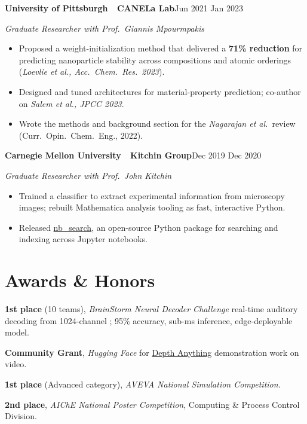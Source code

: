 \documentclass[10pt,letterpaper]{article}
\newcommand{\sansfam}{\sffamily}
\newcommand{\monofam}{\ttfamily}
\newcommand{\bdash}{\,\textemdash\,}
\newcommand{\datestamp}[1]{{\sansfam\footnotesize\color{meta}\figureversion{lf}#1}}
\newcommand{\role}[2]{%
  \filbreak%
  \par\vspace{1pt}%
  \noindent\textbf{#1}\hfill\datestamp{#2}\par\nopagebreak}
\newcommand{\sub}[1]{\noindent\textit{\footnotesize\color{meta} #1}\par\nopagebreak}
\newcommand{\acro}[1]{\textls[80]{#1}}
\begin{document}
\role{University of Pittsburgh \bdash{} CANELa Lab}{Jun 2021 \textendash{} Jan 2023}
\sub{Graduate Researcher with Prof.\ Giannis Mpourmpakis}
\begin{itemize}
  \item Proposed a weight-initialization method that delivered a \textbf{71\% \acro{RMSE} reduction} for predicting nanoparticle stability across compositions and atomic orderings (\emph{Loevlie et al., Acc.\ Chem.\ Res.\ 2023}).
  \item Designed and tuned \acro{ML} architectures for material-property prediction; co-author on \emph{Salem et al., JPCC 2023}.
  \item Wrote the \acro{ML} methods and background section for the \emph{Nagarajan et al.}\ review (Curr.\ Opin.\ Chem.\ Eng., 2022).
\end{itemize}

\role{Carnegie Mellon University \bdash{} Kitchin Group}{Dec 2019 \textendash{} Dec 2020}
\sub{Graduate Researcher with Prof.\ John Kitchin}
\begin{itemize}
  \item Trained a \acro{CNN} classifier to extract experimental information from microscopy images; rebuilt Mathematica analysis tooling as fast, interactive Python.
  \item Released \href{https://tinyurl.com/yzpperdc}{\monofam nb\_search}, an open-source Python package for searching and indexing across Jupyter notebooks.
\end{itemize}

\section{Awards \& Honors}

\begin{list}{}{%
  \setlength{\leftmargin}{3.4em}%
  \setlength{\labelwidth}{2.6em}%
  \setlength{\labelsep}{0.5em}%
  \setlength{\itemsep}{1pt}%
  \setlength{\parsep}{0pt}%
  \setlength{\topsep}{1pt}}
\item[\datestamp{2026}] \textbf{1st place} (10 teams), \textit{BrainStorm Neural Decoder Challenge}\bdash{}real-time auditory decoding from 1024-channel \acro{ECoG}; 95\% accuracy, sub-ms inference, edge-deployable model.
\item[\datestamp{2024}] \textbf{Community Grant}, \textit{Hugging Face}\bdash{}for \href{https://depth-anything.github.io/}{Depth Anything} demonstration work on video.
\item[\datestamp{2019}] \textbf{1st place} (Advanced category), \textit{AVEVA National Simulation Competition}.
\item[\datestamp{2018}] \textbf{2nd place}, \textit{AIChE National Poster Competition}, Computing \& Process Control Division.
\end{list}
\end{document}
